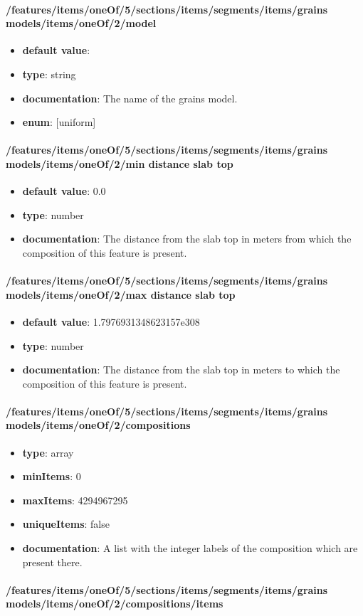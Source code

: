 \paragraph{/features/items/oneOf/5/sections/items/segments/items/grains models/items/oneOf/2/model}
\begin{itemize}\item {\bf default value}: 
\item {\bf type}: string
\item {\bf documentation}: The name of the grains model.
\item {\bf enum}: [uniform]\end{itemize}\paragraph{/features/items/oneOf/5/sections/items/segments/items/grains models/items/oneOf/2/min distance slab top}
\begin{itemize}\item {\bf default value}: 0.0
\item {\bf type}: number
\item {\bf documentation}: The distance from the slab top in meters from which the composition of this feature is present.
\end{itemize}\paragraph{/features/items/oneOf/5/sections/items/segments/items/grains models/items/oneOf/2/max distance slab top}
\begin{itemize}\item {\bf default value}: 1.7976931348623157e308
\item {\bf type}: number
\item {\bf documentation}: The distance from the slab top in meters to which the composition of this feature is present.
\end{itemize}\paragraph{/features/items/oneOf/5/sections/items/segments/items/grains models/items/oneOf/2/compositions}
\begin{itemize}\item {\bf type}: array
\item {\bf minItems}: 0
\item {\bf maxItems}: 4294967295
\item {\bf uniqueItems}: false
\item {\bf documentation}: A list with the integer labels of the composition which are present there.
\end{itemize}\paragraph{/features/items/oneOf/5/sections/items/segments/items/grains models/items/oneOf/2/compositions/items}
